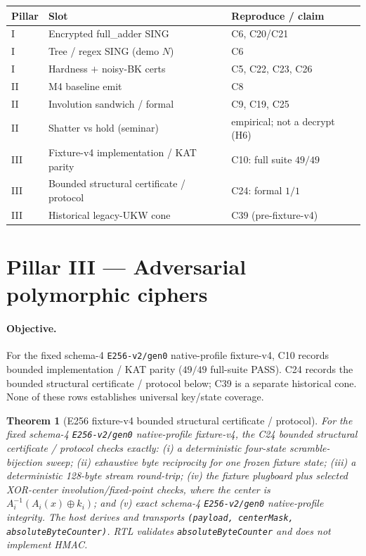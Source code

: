 \documentclass[11pt,a4paper]{article}
\newtheorem{theorem}{Theorem}
\begin{document}
\begin{center}
\small
\begin{tabular}{@{}llp{}@{}}
\toprule
Pillar & Slot & Reproduce / claim \\
\midrule
I & Encrypted full\_adder SING & C6, C20/C21 \\
I & Tree / regex SING (demo $N$) & C6 \\
I & Hardness $+$ noisy-BK certs & C5, C22, C23, C26 \\
II & M4 baseline emit & C8 \\
II & Involution sandwich / formal & C9, C19, C25 \\
II & Shatter vs hold (seminar) & empirical; not a decrypt (H6) \\
III & Fixture-v4 implementation / KAT parity & C10: full suite $49/49$ \\
III & Bounded structural certificate / protocol & C24: formal $1/1$ \\
III & Historical legacy-UKW cone & C39 (pre-fixture-v4) \\
\bottomrule
\end{tabular}
\end{center}

\section{Pillar III --- Adversarial polymorphic ciphers}
\label{sec:pillar3}

\paragraph{Objective.}
For the fixed schema-4 \texttt{E256-v2/gen0} native-profile fixture-v4, C10
records bounded implementation / KAT parity ($49/49$ full-suite PASS). C24
records the bounded structural certificate / protocol below; C39 is a separate
historical cone. None of these rows establishes universal key/state coverage.

\begin{theorem}[E256 fixture-v4 bounded structural certificate / protocol]
\label{thm:enigma256}
For the fixed schema-4 \texttt{E256-v2/gen0} native-profile fixture-v4, the C24
bounded structural certificate / protocol checks exactly: (i) a deterministic
four-state scramble-bijection sweep; (ii) exhaustive byte reciprocity for one
frozen fixture state; (iii) a deterministic 128-byte stream round-trip;
(iv) the fixture plugboard plus selected XOR-center involution/fixed-point
checks, where the center is $A_i^{-1}(A_i(x)\oplus k_i)$; and (v) exact
schema-4 \texttt{E256-v2/gen0} native-profile integrity. The host derives and
transports \texttt{(payload, centerMask, absoluteByteCounter)}. RTL validates
\texttt{absoluteByteCounter} and does not implement HMAC.
\end{theorem}
\end{document}
